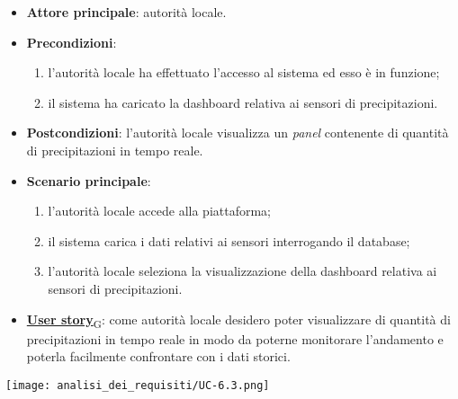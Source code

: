 \begin{itemize}
	\item \textbf{Attore principale}: autorità locale.
	\item \textbf{Precondizioni}:
	      \begin{enumerate}
		      \item l'autorità locale ha effettuato l'accesso al sistema ed esso è in funzione;
		      \item il sistema ha caricato la dashboard relativa ai sensori di precipitazioni.
	      \end{enumerate}
	\item \textbf{Postcondizioni}: l'autorità locale visualizza un \textit{panel} contenente di quantità di precipitazioni in tempo reale.
	\item \textbf{Scenario principale}:
	      \begin{enumerate}
		      \item l'autorità locale accede alla piattaforma;
		      \item il sistema carica i dati relativi ai sensori interrogando il database;
		      \item l'autorità locale seleziona la visualizzazione della dashboard relativa ai sensori di precipitazioni.
	      \end{enumerate}
	\item \href{https://7last.github.io/docs/rtb/documentazione-interna/glossario\#user-story}{\textbf{User story}\textsubscript{G}}:
	      come autorità locale desidero poter visualizzare di quantità di precipitazioni in tempo reale in modo da poterne monitorare l'andamento
	      e poterla facilmente confrontare con i dati storici.
\end{itemize}
\begin{center}
	\texttt{[image: analisi\_dei\_requisiti/UC-6.3.png]}
\end{center}


